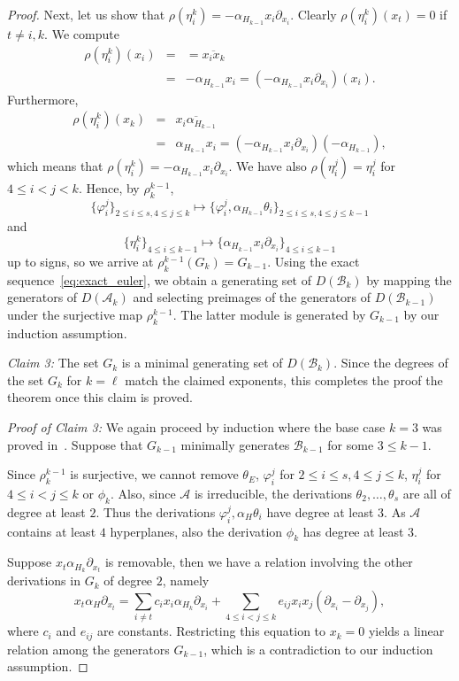 \documentclass[a4paper,11pt]{amsart}
\def\A{{\mathcal{A}}}%
\def\B{{\mathcal{B}}}%
\numberwithin{equation}{section}
\theoremstyle{remark}
\begin{document}
\begin{proof}
Next, let us show that $\rho(\eta_i^k)=-\alpha_{H_{k-1}} x_i\partial_{x_i}$.
Clearly $\rho(\eta_i^k)(x_t)=0$ if $t \neq i,k$. We compute 
\begin{eqnarray*}
\rho(\eta_i^k)(x_i)&=&=\overline{x_ix_k}\\
&=&-\alpha_{H_{k-1}} x_i=
(-\alpha_{H_{k-1}} x_i \partial_{x_i})(x_i).
\end{eqnarray*}
Furthermore,
\begin{eqnarray*}
\rho(\eta_i^k)(x_k)&=&\overline{x_i\alpha_{H_{k-1}}}\\
&=&\alpha_{H_{k-1}} x_i=
(-\alpha_{H_{k-1}} x_i \partial_{x_i})(-\alpha_{H_{k-1}}),
\end{eqnarray*}
which means that $\rho(\eta_i^k)=-\alpha_{H_{k-1}} x_i\partial_{x_i}$.
We have also $\rho(\eta_i^j)=\eta_i^j$ for  $4\le i < j <k$.
 Hence, by $\rho_k^{k-1}$, 
$$
\{\varphi_i^j\}_{2 \le i \le s,4 \le j \le k} \mapsto
\{\varphi_i^j,\alpha_{H_{k-1}} \theta_i\}_{2 \le i \le s,4 \le j \le k-1}
$$
and 
$$
\{\eta_i^k\}_{4 \le i \le k-1} \mapsto 
\{\alpha_{H_{k-1}} x_i \partial_{x_i}\}_{4 \le i \le k-1}
$$
up to signs, so we arrive at $\rho_k^{k-1}(G_k)=G_{k-1}$.
Using the exact sequence~\eqref{eq:exact_euler}, we obtain a generating set of $D(\B_k)$ by mapping the generators of $D(\A_k)$ and selecting preimages of the generators of $D(\B_{k-1})$ under the surjective map $\rho_k^{k-1}$.
The latter module is generated by $G_{k-1}$ by our induction assumption.

\emph{Claim 3:} The set $G_k$ is a minimal generating set of $D(\B_k)$. Since the degrees of the set $G_k$ for $k=\ell$ match the claimed exponents, this completes the proof the theorem once this claim is proved.

\emph{Proof of Claim 3:} We again proceed by induction where the base case $k=3$ was proved in~.
Suppose that $G_{k-1}$ minimally generates $\B_{k-1}$ for some $3\le k-1$.

Since $\rho_k^{k-1}$ is surjective, we cannot remove 
$\theta_E$, $\varphi_i^j$ for $2 \le i \le s, 4 \le j \le k$, $\eta_i^j$ for $4\le i < j \le k$ or $\phi_k$.
Also, since $\A$ is irreducible, the derivations $\theta_2,\dots,\theta_s$ are all of degree at least $2$.
Thus the derivations $\varphi_i^j,\alpha_H \theta_i$  have degree at least $3$.
As $\A$ contains at least $4$ hyperplanes, also the derivation $\phi_k$ has degree at least $3$.

Suppose $x_t\alpha_{H_k} \partial_{x_t}$ is removable, then we have a relation involving the other derivations in $G_k$ of degree $2$, namely
\[
	x_t\alpha_H\partial_{x_t}=
	\sum_{i \neq t} c_ix_i\alpha_{H_k}\partial_{x_i}
	+\sum_{4\le i < j \le k} e_{ij} x_i x_j(\partial_{x_i}-\partial_{x_j}),
\]
where $c_i$ and $e_{ij}$ are constants.
Restricting this equation to $x_k=0$ yields a linear relation among the generators $G_{k-1}$, which is a contradiction to our induction assumption.


\end{proof}
\end{document}
